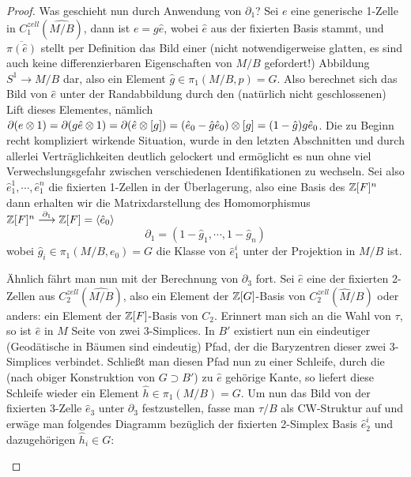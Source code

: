 \begin{proof}
	Was geschieht nun durch Anwendung von $\partial_1$? Sei $e$ eine generische 1-Zelle in $C_1^{zell}(\widehat{ M/B})$, dann ist $e=g\hat e$, wobei $\hat e$ aus der fixierten Basis stammt, und $\overline{\pi(\hat e)}$ stellt per Definition das Bild einer (nicht notwendigerweise glatten, es sind auch keine differenzierbaren Eigenschaften von $M/B$ gefordert!) Abbildung $S^1 \to M/B$ dar, also ein Element $\hat g \in \pi_1(M/B,p) = G$. Also berechnet sich das Bild von $\hat e$ unter der Randabbildung durch den (natürlich nicht geschlossenen) Lift dieses Elementes, nämlich $\partial(e\otimes 1)=\partial(g \hat e \otimes 1) = \partial(\hat e \otimes [g])= (\hat e_0 - \hat g \hat e_0)\otimes [g]= (1-\hat g)g\hat e_0 $. Die zu Beginn recht kompliziert wirkende Situation, wurde in den letzten Abschnitten und durch allerlei Verträglichkeiten deutlich gelockert und ermöglicht es nun ohne viel Verwechslungsgefahr zwischen verschiedenen Identifikationen zu wechseln. Sei also $\hat e_1^1 ,\cdots, \hat e_1^n$ die fixierten 1-Zellen in der Überlagerung, also eine Basis des $\mathbb{Z}[F]^n$ dann erhalten wir die Matrixdarstellung des Homomorphismus $\mathbb{Z}[F]^n \stackrel {\partial_1} \longrightarrow \mathbb{Z}[F]=\langle \hat e_0\rangle$
	\[
		\partial_1 = (1-\hat g_1, \cdots , 1- \hat g_n) 
	\]
	wobei $\hat g_i \in \pi_1(M/B,e_0)=G$ die Klasse von $\hat e_1^i$ unter der Projektion in $M/B$ ist.

	Ähnlich fährt man nun mit der Berechnung von $\partial_3$ fort. Sei $\hat e$ eine der fixierten 2-Zellen aus $C_2^{zell}(\widehat{ M/B})$, also ein Element der $\mathbb{Z}[G]$-Basis von $C_2^{zell}(\widehat M/B)$ oder anders: ein Element der $\mathbb{Z}[F]$-Basis von $C_2$. Erinnert man sich an die Wahl von $\tau$, so ist $\hat e$ in $M$ Seite von zwei 3-Simplices. In $B'$ existiert nun ein eindeutiger (Geodätische in Bäumen sind eindeutig) Pfad, der die Baryzentren dieser zwei 3-Simplices verbindet. Schließt man diesen Pfad nun zu einer Schleife, durch die (nach obiger Konstruktion von $G\supset B'$) zu $\hat e$ gehörige Kante, so liefert diese Schleife wieder ein Element $\hat h \in \pi_1(M/B)=G$. Um nun das Bild von der fixierten 3-Zelle $\hat e_3$ unter $\partial_3$ festzustellen, fasse man $\tau/B$ als CW-Struktur auf und erwäge man folgendes Diagramm bezüglich der fixierten 2-Simplex Basis $\hat e_2^i$ und dazugehörigen $\hat h_i \in G$:
	
\begin{center}


\end{center}
\end{proof}

